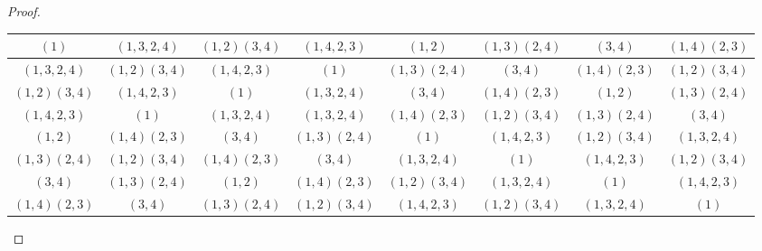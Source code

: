 \documentclass{article}
\begin{document}
\begin{proof}
    \begin{table}[h]
        \scriptsize
        \setlength{\tabcolsep}{0.4em} %
        \begin{tabular}{ |c|c|c|c|c|c|c|c| } 
            \hline
            $(1)$ & $(1, 3, 2, 4)$ & $(1, 2)(3, 4)$ & $(1, 4, 2, 3)$ & $(1, 2)$ & $(1, 3)(2, 4)$ & $(3, 4)$ & $(1, 4)(2, 3)$ \\
            \hline
            $(1, 3, 2, 4)$ & $(1, 2)(3, 4)$ & $(1, 4, 2, 3)$ & $(1)$ & $(1, 3)(2, 4)$ & $(3, 4)$ & $(1, 4)(2, 3)$ & $(1, 2)(3, 4)$ \\ 
            \hline
            $(1, 2)(3, 4)$ & $(1, 4, 2, 3)$ & $(1)$ & $(1, 3, 2, 4)$ & $(3, 4)$ & $(1, 4)(2, 3)$ & $(1, 2)$ & $(1, 3)(2, 4)$ \\
            \hline
            $(1, 4, 2, 3)$ & $(1)$ & $(1, 3, 2, 4)$ & $(1, 3, 2, 4)$ & $(1, 4)(2, 3)$ & $(1, 2)(3, 4)$ & $(1, 3)(2, 4)$ & $(3, 4)$ \\
            \hline
            $(1, 2)$ & $(1, 4)(2, 3)$ & $(3, 4)$ & $(1, 3)(2, 4)$ & $(1)$ & $(1, 4, 2, 3)$ & $(1, 2)(3, 4)$ & $(1, 3, 2, 4)$ \\
            \hline
            $(1, 3)(2, 4)$ & $(1, 2)(3, 4)$ & $(1, 4)(2, 3)$ & $(3, 4)$ & $(1, 3, 2, 4)$ & $(1)$ & $(1, 4, 2, 3)$ & $(1, 2)(3, 4)$ \\
            \hline
            $(3, 4)$ & $(1, 3)(2, 4)$ & $(1, 2)$ & $(1, 4)(2, 3)$ & $(1, 2)(3, 4)$ & $(1, 3, 2, 4)$ & $(1)$ & $(1, 4, 2, 3)$ \\
            \hline
            $(1, 4)(2, 3)$ & $(3, 4)$ & $(1, 3)(2, 4)$ & $(1, 2)(3, 4)$ & $(1, 4, 2, 3)$ & $(1, 2)(3, 4)$ & $(1, 3, 2, 4)$ & $(1)$ \\
            \hline
        \end{tabular}
    \end{table}
\end{proof}
\end{document}
